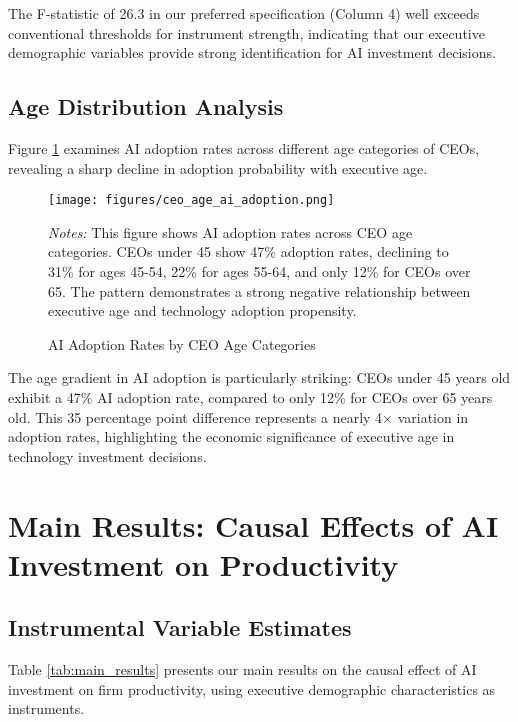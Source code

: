 \documentclass[12pt, a4paper]{article}
\begin{document}
The F-statistic of 26.3 in our preferred specification (Column 4) well exceeds conventional thresholds for instrument strength, indicating that our executive demographic variables provide strong identification for AI investment decisions.

\subsection{Age Distribution Analysis}

Figure \ref{fig:age_distribution} examines AI adoption rates across different age categories of CEOs, revealing a sharp decline in adoption probability with executive age.

\begin{figure}[H]
\centering
\texttt{[image: figures/ceo\_age\_ai\_adoption.png]}
\caption{AI Adoption Rates by CEO Age Categories}
\label{fig:age_distribution}
\begin{minipage}{\textwidth}
\footnotesize
\textit{Notes:} This figure shows AI adoption rates across CEO age categories. CEOs under 45 show 47\% adoption rates, declining to 31\% for ages 45-54, 22\% for ages 55-64, and only 12\% for CEOs over 65. The pattern demonstrates a strong negative relationship between executive age and technology adoption propensity.
\end{minipage}
\end{figure}

The age gradient in AI adoption is particularly striking: CEOs under 45 years old exhibit a 47\% AI adoption rate, compared to only 12\% for CEOs over 65 years old. This 35 percentage point difference represents a nearly 4× variation in adoption rates, highlighting the economic significance of executive age in technology investment decisions.

\section{Main Results: Causal Effects of AI Investment on Productivity}

\subsection{Instrumental Variable Estimates}

Table \ref{tab:main_results} presents our main results on the causal effect of AI investment on firm productivity, using executive demographic characteristics as instruments.
\end{document}

